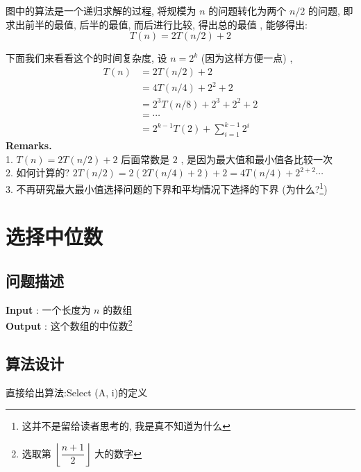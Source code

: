 \documentclass[a4paper, 10pt]{ctexart} %
\begin{document}
图中的算法是一个递归求解的过程, 将规模为 $n$ 的问题转化为两个 $n / 2$ 的问题, 
即求出前半的最值, 后半的最值, 而后进行比较, 得出总的最值
, 能够得出:
\[
T\left(n\right) = 2 T\left(n /2\right) + 2
\]

下面我们来看看这个的时间复杂度, 设 $n = 2 ^{k}$
(因为这样方便一点) , 
\[
\begin{aligned}
    T\left(n \right)& = 2  T\left(n /2\right) +2 \\
    & = 4 T\left(n / 4\right) + 2 ^{2} +2 \\
    & = 2 ^{3}T\left(n / 8\right) + 2 ^{3} + 2 ^{2} +2 \\
    & = \cdots \\
    & = 2^{k-1} T\left(2\right) + \sum_{i=1} ^{k-1} 2 ^{i}
\end{aligned}
\]
\noindent \textbf{Remarks.} \\
1. $T\left(n\right) = 2 T\left( n /2\right) + 2$ 
后面常数是   $2$ , 是因为最大值和最小值各比较一次\\ 
2. 如何计算的? $2 T\left(n /2 \right) = 
2\left(2 T\left( n /4\right) + 2\right) + 2 
= 4 T\left( n / 4\right) + 2 ^{2 +2} \cdots$\\
3. 不再研究最大最小值选择问题的下界和平均情况下选择的下界 
(为什么?\footnote{这并不是留给读者思考的, 我是真不知道为什么})

\section{选择中位数} 
\subsection{问题描述}

\noindent \textbf{Input} : 一个长度为 $n$ 的数组\\
\textbf{Output} : 这个数组的中位数\footnote{
    选取第 $\left\lfloor \dfrac{n+1}{2} \right\rfloor$ 大的数字}
\subsection{算法设计}
直接给出算法:{\sffamily Select (A, i)}的定义
\end{document}
